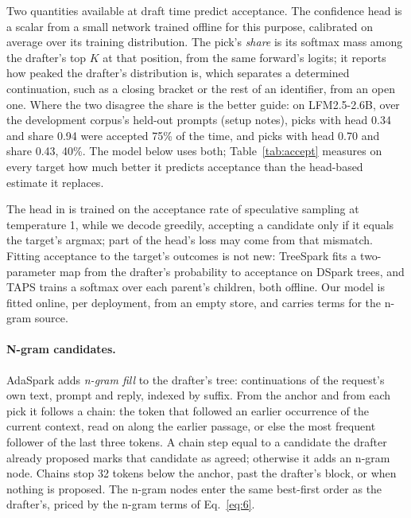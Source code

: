 \documentclass[10pt,twocolumn,letterpaper]{article}
\begin{document}
Two quantities available at draft time predict acceptance. The confidence head is a scalar from a small network trained offline for this purpose, calibrated on average over its training distribution. The pick's \emph{share} is its softmax mass among the drafter's top $K$ at that position, from the same forward's logits; it reports how peaked the drafter's distribution is, which separates a determined continuation, such as a closing bracket or the rest of an identifier, from an open one. Where the two disagree the share is the better guide: on LFM2.5-2.6B, over the development corpus's held-out prompts (setup notes), picks with head 0.34 and share 0.94 were accepted 75\% of the time, and picks with head 0.70 and share 0.43, 40\%. The model below uses both; Table~\ref{tab:accept} measures on every target how much better it predicts acceptance than the head-based estimate it replaces.

The head in \cite{cheng2026dspark} is trained on the acceptance rate of speculative sampling at temperature 1, while we decode greedily, accepting a candidate only if it equals the target's argmax; part of the head's loss may come from that mismatch. Fitting acceptance to the target's outcomes is not new: TreeSpark \cite{zhou2026treespark} fits a two-parameter map from the drafter's probability to acceptance on DSpark trees, and TAPS \cite{wang2026taps} trains a softmax over each parent's children, both offline. Our model is fitted online, per deployment, from an empty store, and carries terms for the n-gram source.





\paragraph{N-gram candidates.} AdaSpark adds \emph{n-gram fill} to the drafter's tree: continuations of the request's own text, prompt and reply, indexed by suffix. From the anchor and from each pick it follows a chain: the token that followed an earlier occurrence of the current context, read on along the earlier passage, or else the most frequent follower of the last three tokens. A chain step equal to a candidate the drafter already proposed marks that candidate as agreed; otherwise it adds an n-gram node. Chains stop 32 tokens below the anchor, past the drafter's block, or when nothing is proposed. The n-gram nodes enter the same best-first order as the drafter's, priced by the n-gram terms of Eq.~\eqref{eq:6}.
\end{document}
